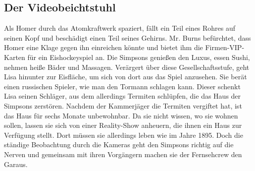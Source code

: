 
\subsection{Der Videobeichtstuhl}
Als Homer durch das Atomkraftwerk spaziert, fällt ein Teil eines Rohres auf seinen Kopf und beschädigt einen Teil seines Gehirns. Mr. Burns befürchtet, dass Homer eine Klage gegen ihn einreichen könnte und bietet ihm die Firmen-VIP-Karten für ein Eishockeyspiel an. Die Simpsons genießen den Luxus, essen Sushi, nehmen heiße Bäder und Massagen. Verärgert über diese Gesellschaftsstufe, geht Lisa hinunter zur Eisfläche, um sich von dort aus das Spiel anzusehen. Sie berät einen russischen Spieler, wie man den Tormann schlagen kann. Dieser schenkt Lisa seinen Schläger, aus dem allerdings Termiten schlüpfen, die das Haus der Simpsons zerstören. Nachdem der Kammerjäger die Termiten vergiftet hat, ist das Haus für sechs Monate unbewohnbar. Da sie nicht wissen, wo sie wohnen sollen, lassen sie sich von einer Reality-Show anheuern, die ihnen ein Haus zur Verfügung stellt. Dort müssen sie allerdings leben wie im Jahre 1895. Doch die ständige Beobachtung durch die Kameras geht den Simpsons richtig auf die Nerven und gemeinsam mit ihren Vorgängern machen sie der Fernsehcrew den Garaus.


